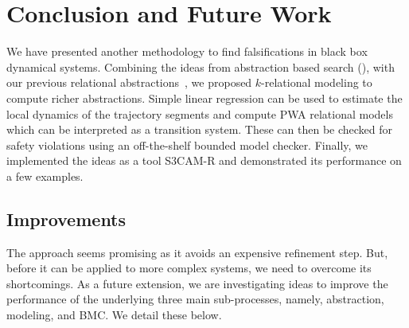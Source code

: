\section{Conclusion and Future Work}

We have presented another methodology to find falsifications in black
box dynamical systems. Combining the ideas from abstraction based
search (), with our previous relational
abstractions~\cite{zutshi2012timed}, we proposed $k$-relational
modeling to compute richer abstractions. Simple linear regression can
be used to estimate the local dynamics of the trajectory segments and
compute PWA relational models which can be interpreted as a transition
system.  These can then be checked for safety violations using an
off-the-shelf bounded model checker.  Finally, we implemented the
ideas as a tool S3CAM-R and demonstrated its performance on a few examples.

\subsection{Improvements}

The approach seems promising as it avoids an expensive refinement
step. But, before it can be applied to more complex systems, we need
to overcome its shortcomings.  As a future extension, we are
investigating ideas to improve the performance of the underlying three
main sub-processes, namely, abstraction, modeling, and BMC. We detail
these below.

